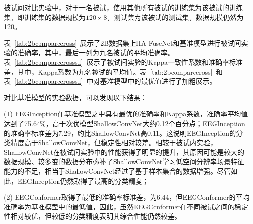 被试间对比实验中，对于一名被试，使用其他所有被试的训练集为该被试的训练集，即训练集的数据规模为\(120\times8\)，测试集为该被试的测试集，数据规模仍然为120。

表~\ref{tab:2bcomparecross}~展示了2B数据集上HA-FuseNet和基准模型进行被试间实验的准确率，其中，最后一列为九名被试的平均准确率。表~\ref{tab:2bcomparecrosssd}~展示了被试间实验的Kappa一致性系数和准确率标准差，其中，Kappa系数为九名被试的平均值。表~\ref{tab:2bcomparecross}~和表~\ref{tab:2bcomparecrosssd}~中对基准模型中的最优值进行了加粗展示。

对比基准模型的实验数据，可以发现以下结果：

(1) EEGInception在基准模型之中具有最优的准确率和Kappa系数，准确率平均值达到了75.64\%，高于次优模型ShallowConvNet大约0.12个百分点；EEGInception的准确率标准差为7.29，约比ShallowConvNet高0.11。这说明EEGInception的分类精度高于ShallowConvNet，但稳定性相对较差。相较于被试内实验，ShallowConvNet在被试间实验中的性能获得了明显的提升，其原因可能是较大的数据规模、较多变的数据分布弥补了ShallowConvNet学习低空间分辨率场景特征能力的不足，相当于ShallowConvNet经过了基于样本集合的数据增强。尽管如此，EEGInception仍然取得了最高的分类精度；

(2) EEGConformer取得了最低的准确率标准差，为6.44，但EEGConformer的平均准确率为基准模型中的最低值，因此，虽然EEGConformer在不同被试之间的稳定性相对较优，但较低的分类精度表明其综合性能仍然较差。

